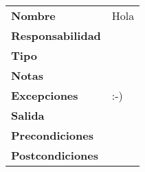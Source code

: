 \documentclass[11pt,a4paper]{article}
\begin{document}
\begin{table}[H]
	\centering
	\begin{tabularx}{\textwidth}{l|l}
		\textbf{Nombre}				& Hola \\ 
		\textbf{Responsabilidad}	&  \\ 
		\textbf{Tipo}				&  \\ 
		\textbf{Notas}				&  \\ 
		\textbf{Excepciones}		& :-) \\ 
		\textbf{Salida}				&  \\ 
		\textbf{Precondiciones}		&  \\ 
		\textbf{Postcondiciones}	&  \\ 
	\end{tabularx}
\end{table}	
\end{document}
